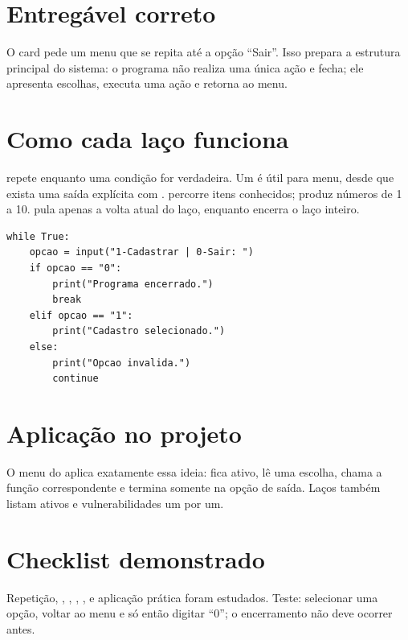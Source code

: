 \documentclass[11pt,a4paper]{article}
\begin{document}
\section*{Entregável correto}
O card pede um menu que se repita até a opção ``Sair''. Isso prepara a estrutura principal do sistema: o programa não realiza uma única ação e fecha; ele apresenta escolhas, executa uma ação e retorna ao menu.
\section*{Como cada laço funciona}
 repete enquanto uma condição for verdadeira. Um  é útil para menu, desde que exista uma saída explícita com .  percorre itens conhecidos;  produz números de 1 a 10.  pula apenas a volta atual do laço, enquanto  encerra o laço inteiro.
\begin{lstlisting}
while True:
    opcao = input("1-Cadastrar | 0-Sair: ")
    if opcao == "0":
        print("Programa encerrado.")
        break
    elif opcao == "1":
        print("Cadastro selecionado.")
    else:
        print("Opcao invalida.")
        continue
\end{lstlisting}
\section*{Aplicação no projeto}
O menu do  aplica exatamente essa ideia: fica ativo, lê uma escolha, chama a função correspondente e termina somente na opção de saída. Laços  também listam ativos e vulnerabilidades um por um.
\section*{Checklist demonstrado}
Repetição, , , , ,  e aplicação prática foram estudados. Teste: selecionar uma opção, voltar ao menu e só então digitar ``0''; o encerramento não deve ocorrer antes.
\end{document}
